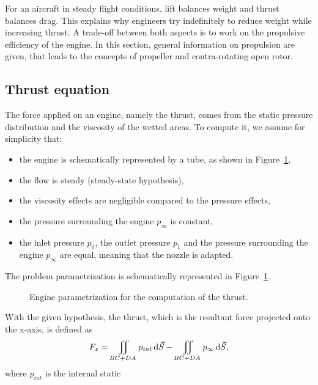 
For an aircraft in steady flight conditions, 
lift balances weight and 
thrust balances drag. This explains why engineers try
indefinitely to reduce weight while increasing
thrust. A trade-off between both aspects is to work
on the propulsive efficiency of the engine. In this
section, general information on propulsion are given,
that leads to the concepts of propeller and
contra-rotating open rotor.

\subsection{Thrust equation}
\label{sub:cror_thrust}

The force applied on an engine, namely the thrust,
comes from the static pressure
distribution and the viscosity of the wetted areas.
To compute it, we assume for simplicity that:
 \begin{itemize} \itemsep0pt \parskip0pt
  \item the engine is schematically represented by a tube,
  as shown in Figure~\ref{fig:engine_parametrization},
  \item the flow is steady (steady-state hypothesis),
  \item the viscosity effects are negligible compared
  to the pressure effects,
  \item the pressure surrounding the engine $p_\infty$
  is constant,
  \item the inlet pressure $p_0$, the outlet pressure
  $p_1$ and the pressure surrounding the engine $p_\infty$ are equal,
  meaning that the nozzle is adapted.
\end{itemize}
The problem parametrization is schematically represented
in Figure~\ref{fig:engine_parametrization}.
\begin{figure}[htp]
  \centering
  \quad{}
  \caption{Engine parametrization for the computation of the thrust.}
  \label{fig:engine_parametrization}
\end{figure}
With the given hypothesis, the thrust, which is
the resultant force
projected onto the x-axis, is defined as
\begin{equation}
	F_x = \iint_{BC + DA} p_{int} \diff \vec{S} - 
	    \iint_{BC + DA} p_{\infty} \diff \vec{S},
	\label{eq:thrust_1}
\end{equation}
where $p_{int}$ is the internal static
